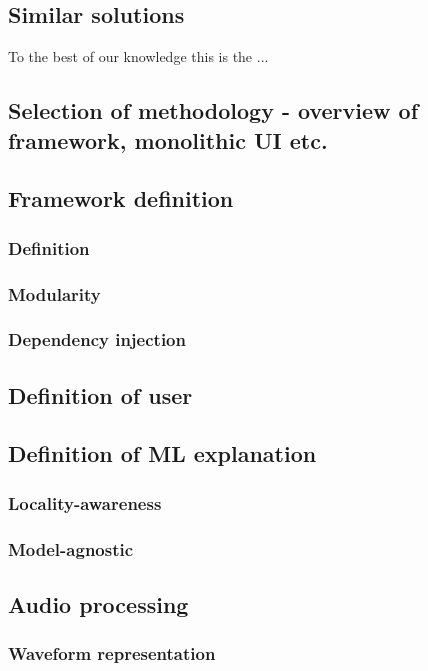 \documentclass[
    bindingoffset=5mm,  %
    footnoteindent=3mm, %
    hyphenation=true    %
]{src/wut-thesis}
\begin{document}
\subsection{Similar solutions}

To the best of our knowledge this is the ...

\subsection{Selection of methodology - overview of framework, monolithic UI etc.}

\subsection{Framework definition}
\subsubsection{Definition}
\subsubsection{Modularity}
\subsubsection{Dependency injection}

\subsection{Definition of user}

\subsection{Definition of ML explanation}
\subsubsection{Locality-awareness}
\subsubsection{Model-agnostic}

\subsection{Audio processing}
\subsubsection{Waveform representation}
\end{document}
